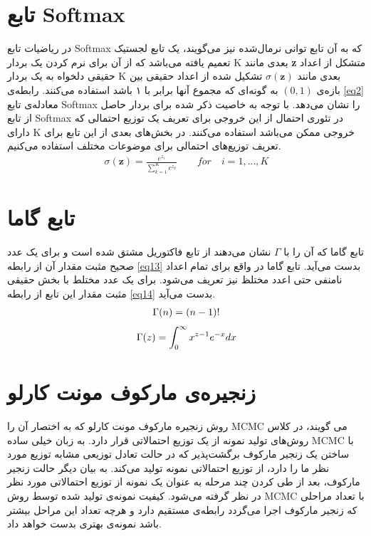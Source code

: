 \section{تابع Softmax}
\label{chap2sec9}
در ریاضیات تابع
Softmax
که به آن تابع توانی‌ نرمال‌شده
 نیز می‌‌گویند، یک تابع لجستیک تعمیم یافته می‌‌باشد که از آن برای نرم کردن یک بردار
K
بعدی مانند
\textbf{z}
متشکل از اعداد حقیقی‌ دلخواه به یک بردار
K
بعدی مانند
$\sigma(\textbf{z})$ 
تشکیل شده از اعداد حقیقی‌ بین بازه‌ی
$(0,1)$
به گونه‌ای که مجموع آنها برابر با ۱ باشد استفاده می‌‌کنند. رابطه‌ی
\ref{eq2}
معادله‌ی تابع
Softmax
را نشان می‌‌دهد. با توجه به خاصیت ذکر شده برای بردار حاصل از تابع
Softmax
در تئوری احتمال از این خروجی برای تعریف یک توزیع احتمالی که دارای
K
خروجی ممکن می‌‌باشد استفاده می‌کنند. در بخش‌های بعدی از این تابع برای تعریف توزیع‌های احتمالی‌ برای موضوعات مختلف استفاده می‌‌کنیم.
\begin{align}
\sigma(\textbf{z}) = \frac{e^{z_i}}{\sum_{k=1}^{K}e^{z_k}} \quad\quad for\quad i = 1, ..., K
\label{eq2}
\end{align}

\section{تابع گاما}
\label{chap2sec8}
تابع گاما
 که آن را با
$\Gamma$
نشان می‌‌دهند از تابع فاکتوریل مشتق شده است و برای یک عدد صحیح مثبت مقدار آن از رابطه
\ref{eq13}
بدست می‌‌آید. تابع گاما در واقع برای تمام اعداد نامنفی حتی اعدد مختلظ نیز تعریف می‌‌شود. برای یک عدد مختلط با بخش حقیقی مثبت مقدار این تابع از رابطه
\ref{eq14}
بدست می‌‌آید.
\begin{align}
\centering
\label{eq13}
	\Gamma(n) = (n-1)!
\end{align}
\begin{align}
\centering
\label{eq14}
	\Gamma(z) = \int_{0}^{\infty} x^{z-1}e^{-x}dx
\end{align}



\section{زنجیره‌ی مارکوف مونت کارلو}
\label{chap2sec6}
روش زنجیره‌ مارکوف مونت کارلو
 که به اختصار آن را
MCMC
می‌ گویند، در کلاس روش‌های تولید نمونه از یک توزیع احتمالاتی قرار دارد. به زبان خیلی‌ ساده
MCMC
با ساختن یک زنجیر مارکوف برگشت‌پذیر
که در حالت تعادل توزیعی مشابه توزیع مورد نظر ما را دارد، از توزیع احتمالاتی نمونه تولید می‌‌کند. به بیان دیگر حالت زنجیر مارکوف، بعد از طی‌ کردن چند مرحله به عنوان یک نمونه از توزیع احتمالاتی مورد نظر در نظر گرفته می‌شود. کیفیت نمونه‌‌ی تولید شده توسط روش
MCMC
با تعداد مراحلی که زنجیر مارکوف اجرا می‌‌گردد رابطه‌ی مستقیم دارد و هرچه تعداد این مراحل بیشتر باشد نمونه‌ی بهتری بدست خواهد داد.


